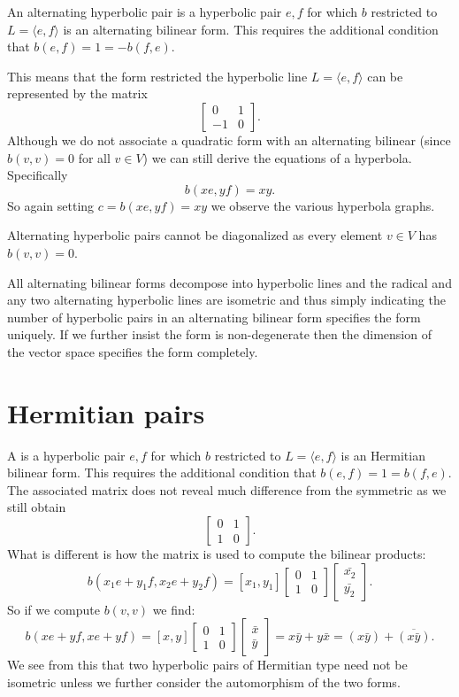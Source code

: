 \documentclass[12pt]{article}
\begin{document}
An alternating hyperbolic pair is a hyperbolic pair $e,f$ for which $b$ restricted 
to $L=\langle e,f\rangle$ is an alternating bilinear form.  This requires the 
additional condition that $b(e,f)=1=-b(f,e)$.

This means that the form restricted the hyperbolic line $L=\langle e,f\rangle$ 
can be represented by the matrix
\[\begin{bmatrix} 0 & 1\\ -1 & 0\end{bmatrix}.\]
Although we do not associate a quadratic form with an alternating bilinear
(since $b(v,v)=0$ for all $v\in V$) we can still derive the equations of
a hyperbola.  Specifically
\[b(xe,yf)=xy.\]
So again setting $c=b(xe,yf)=xy$ we observe the various hyperbola graphs.

Alternating hyperbolic pairs cannot be diagonalized as every element 
$v\in V$ has $b(v,v)=0$.

All alternating bilinear forms decompose into hyperbolic lines and the radical and 
any two alternating hyperbolic lines are isometric and thus simply indicating the number 
of hyperbolic pairs in an alternating bilinear form specifies the form uniquely.  If we 
further insist the form is non-degenerate then the dimension of the vector space
specifies the form completely.

\section{Hermitian pairs}

A \emph{} is a hyperbolic pair $e,f$ for which $b$ restricted to 
$L=\langle e,f\rangle$ is an Hermitian bilinear form.  This requires the 
additional condition that $b(e,f)=1=b(f,e)$.  The associated matrix does not reveal
 much difference from the symmetric as we still obtain
\[\begin{bmatrix} 0 & 1\\ 1 & 0\end{bmatrix}.\]
What is different is how the matrix is used to compute the bilinear products:
\[b(x_1e+y_1 f,x_2 e+y_2 f)=
[x_1,y_1]\begin{bmatrix} 0 & 1\\ 1 & 0\end{bmatrix}
\begin{bmatrix} \bar{x_2}\\ \bar{y_2}\end{bmatrix}.\]
So if we compute $b(v,v)$ we find:
\[b(xe+y f,x e+y f)=
[x,y]\begin{bmatrix} 0 & 1\\ 1 & 0\end{bmatrix}
\begin{bmatrix} \bar{x}\\ \bar{y}\end{bmatrix}
=x\bar{y}+y\bar{x}=(x\bar{y})+\overline{(x\bar{y})}.\]
We see from this that two hyperbolic pairs of Hermitian type need not be isometric 
unless we further consider the automorphism of the two forms.
\end{document}
